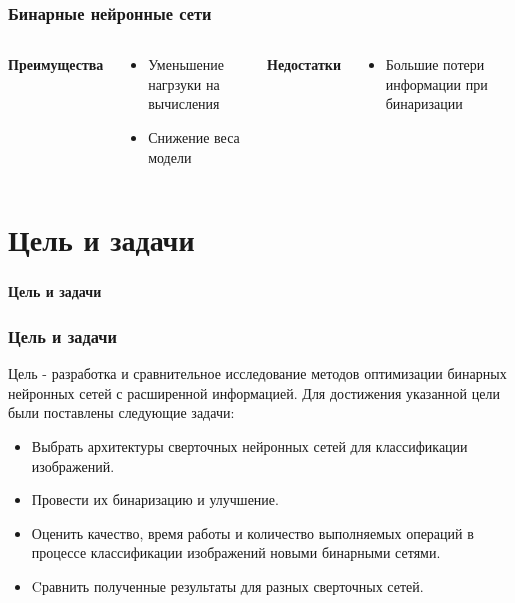 \documentclass[usenames,dvipsnames, 10pt]{beamer}
\begin{document}
\begin{frame}
\frametitle{Бинарные нейронные сети}
  \begin{columns}
    \begin{center}
      \textbf{Преимущества}
    \end{center}
    \vspace{0.2cm} %

    \begin{center}
      \begin{itemize}
          \item Уменьшение нагрзуки на вычисления
          \item Снижение веса модели
      \end{itemize}
    \end{center}

    \begin{center}
      \textbf{Недостатки}
    \end{center}
    \vspace{0.2cm} %

    \begin{center}
        \begin{itemize}
          \item Большие потери информации при бинаризации
        \end{itemize}
    \end{center}
  \end{columns}


\end{frame}

\section{Цель и задачи}
\begin{frame}
\frametitle{\phatom}
\centering
\Large \textbf{Цель и задачи}
\end{frame}

\begin{frame}
\frametitle{Цель и задачи}
Цель - разработка и сравнительное исследование методов оптимизации бинарных нейронных сетей с расширенной информацией.
\vskip 0.5cm
Для достижения указанной цели были поставлены следующие задачи:
\begin{itemize}
    \item Выбрать архитектуры сверточных нейронных сетей для классификации изображений.
    \item Провести их бинаризацию и улучшение.
    \item Оценить качество, время работы и количество выполняемых операций в процессе классификации изображений новыми бинарными сетями.
    \item Cравнить полученные результаты для разных сверточных сетей.
\end{itemize}
\end{frame}
\end{document}

